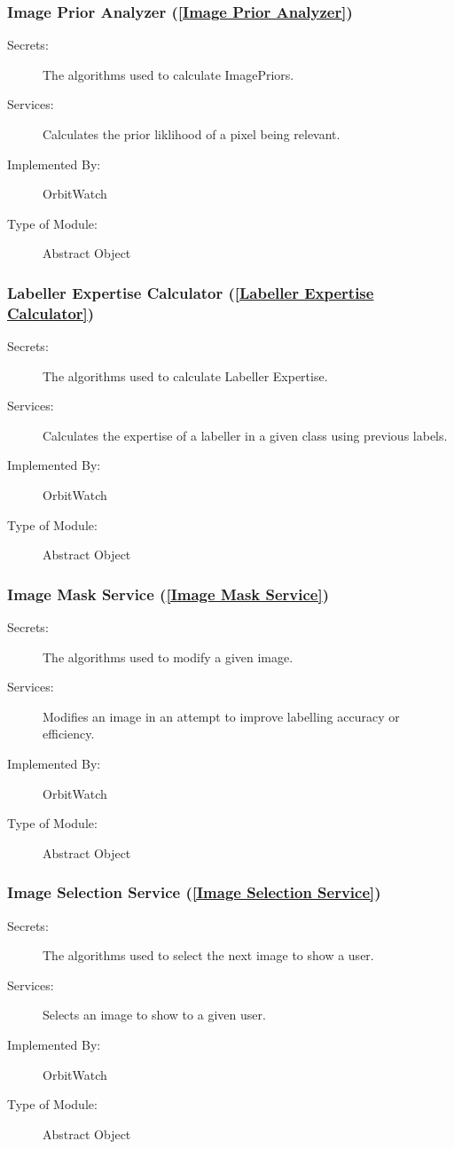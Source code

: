 \documentclass[12pt, titlepage]{article}
\begin{document}
\subsubsection{Image Prior Analyzer (\ref{Image Prior Analyzer})}
\begin{description}
\item[Secrets:] The algorithms used to calculate ImagePriors.
\item[Services:] Calculates the prior liklihood of a pixel being relevant.
\item[Implemented By:] OrbitWatch
\item[Type of Module:] Abstract Object
\end{description}

\subsubsection{Labeller Expertise Calculator (\ref{Labeller Expertise Calculator})}
\begin{description}
\item[Secrets:] The algorithms used to calculate Labeller Expertise.
\item[Services:] Calculates the expertise of a labeller in a given class using previous labels.
\item[Implemented By:] OrbitWatch
\item[Type of Module:] Abstract Object
\end{description}

\subsubsection{Image Mask Service (\ref{Image Mask Service})}
\begin{description}
\item[Secrets:] The algorithms used to modify a given image.
\item[Services:] Modifies an image in an attempt to improve labelling accuracy or efficiency.
\item[Implemented By:] OrbitWatch
\item[Type of Module:] Abstract Object
\end{description}

\subsubsection{Image Selection Service (\ref{Image Selection Service})}
\begin{description}
\item[Secrets:] The algorithms used to select the next image to show a user.
\item[Services:] Selects an image to show to a given user. 
\item[Implemented By:] OrbitWatch
\item[Type of Module:] Abstract Object
\end{description}
\end{document}
